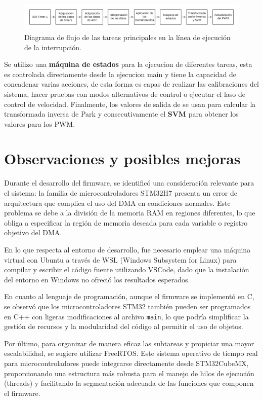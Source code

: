\documentclass[11pt]{report}
\begin{document}
\begin{figure}[ht]
	\centering
	\includegraphics[width=\textwidth]{imagenes/Diagramas/linea timer.png}
	\caption{Diagrama de flujo de las tareas principales en la línea de ejecución de la interrupción.}
	\label{fig:linea_ejecucion_interrupcion}
\end{figure}
\FloatBarrier

Se utilizo una \textbf{máquina de estados} para la ejecucion de diferentes tareas, esta es controlada directamente desde la ejecucion main y tiene la capacidad de concadenar varias acciones, de esta forma es capas de realizar las calibraciones del sistema, hacer pruebas con modos alternativos de control o ejecutar el laso de control de velocidad. Finalmente, los valores de salida de se usan para calcular la transformada inversa de Park y consecutivamente el \textbf{SVM} para obtener los valores para los PWM.


\newpage
\section{Observaciones y posibles mejoras}

Durante el desarrollo del firmware, se identificó una consideración relevante para el sistema: la familia de microcontroladores STM32H7 presenta un error de arquitectura que complica el uso del DMA en condiciones normales. Este problema se debe a la división de la memoria RAM en regiones diferentes, lo que obliga a especificar la región de memoria deseada para cada variable o registro objetivo del DMA.

En lo que respecta al entorno de desarrollo, fue necesario emplear una máquina virtual con Ubuntu a través de WSL (Windows Subsystem for Linux) para compilar y escribir el código fuente utilizando VSCode, dado que la instalación del entorno en Windows no ofreció los resultados esperados.

En cuanto al lenguaje de programación, aunque el firmware se implementó en C, se observó que los microcontroladores STM32 también pueden ser programados en C++ con ligeras modificaciones al archivo \texttt{main}, lo que podría simplificar la gestión de recursos y la modularidad del código al permitir el uso de objetos.

Por último, para organizar de manera eficaz las subtareas y propiciar una mayor escalabilidad, se sugiere utilizar FreeRTOS. Este sistema operativo de tiempo real para microcontroladores puede integrarse directamente desde STM32CubeMX, proporcionando una estructura más robusta para el manejo de hilos de ejecución (threads) y facilitando la segmentación adecuada de las funciones que componen el firmware.
\end{document}
